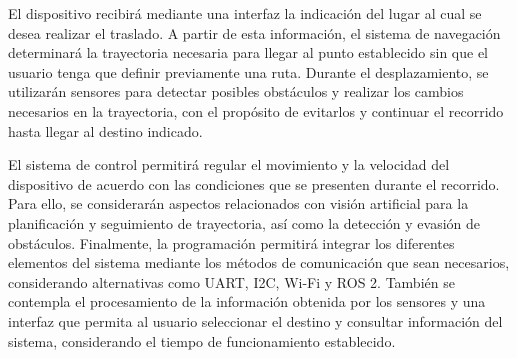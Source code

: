 El dispositivo recibirá mediante una interfaz la indicación del lugar al cual se desea realizar el traslado. A partir de esta información, el sistema de navegación determinará la trayectoria necesaria para llegar al punto establecido sin que el usuario tenga que definir previamente una ruta. Durante el desplazamiento, se utilizarán sensores para detectar posibles obstáculos y realizar los cambios necesarios en la trayectoria, con el propósito de evitarlos y continuar el recorrido hasta llegar al destino indicado.

El sistema de control permitirá regular el movimiento y la velocidad del dispositivo de acuerdo con las condiciones que se presenten durante el recorrido. Para ello, se considerarán aspectos relacionados con visión artificial para la planificación y seguimiento de trayectoria, así como la detección y evasión de obstáculos. Finalmente, la programación permitirá integrar los diferentes elementos del sistema mediante los métodos de comunicación que sean necesarios, considerando alternativas como UART, I2C, Wi-Fi y ROS 2. También se contempla el procesamiento de la información obtenida por los sensores y una interfaz que permita al usuario seleccionar el destino y consultar información del sistema, considerando el tiempo de funcionamiento establecido.

